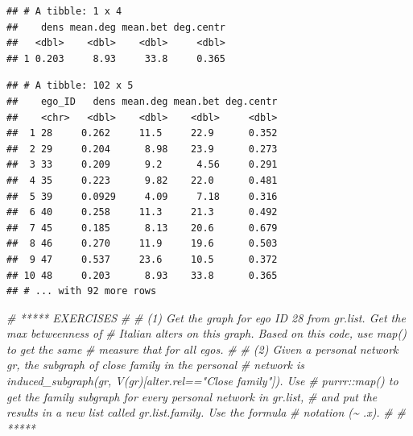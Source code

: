 \documentclass[
]{book}
\newenvironment{Shaded}{\begin{snugshade}}{\end{snugshade}}
\newcommand{\AttributeTok}[1]{\textcolor[rgb]{0.77,0.63,0.00}{#1}}
\newcommand{\CommentTok}[1]{\textcolor[rgb]{0.56,0.35,0.01}{\textit{#1}}}
\newcommand{\ConstantTok}[1]{\textcolor[rgb]{0.00,0.00,0.00}{#1}}
\newcommand{\FunctionTok}[1]{\textcolor[rgb]{0.00,0.00,0.00}{#1}}
\newcommand{\NormalTok}[1]{#1}
\newcommand{\SpecialCharTok}[1]{\textcolor[rgb]{0.00,0.00,0.00}{#1}}
\newcommand{\StringTok}[1]{\textcolor[rgb]{0.31,0.60,0.02}{#1}}
\begin{document}
\begin{verbatim}
## # A tibble: 1 x 4
##    dens mean.deg mean.bet deg.centr
##   <dbl>    <dbl>    <dbl>     <dbl>
## 1 0.203     8.93     33.8     0.365
\end{verbatim}

\begin{Shaded}
\end{Shaded}

\begin{verbatim}
## # A tibble: 102 x 5
##    ego_ID   dens mean.deg mean.bet deg.centr
##    <chr>   <dbl>    <dbl>    <dbl>     <dbl>
##  1 28     0.262     11.5     22.9      0.352
##  2 29     0.204      8.98    23.9      0.273
##  3 33     0.209      9.2      4.56     0.291
##  4 35     0.223      9.82    22.0      0.481
##  5 39     0.0929     4.09     7.18     0.316
##  6 40     0.258     11.3     21.3      0.492
##  7 45     0.185      8.13    20.6      0.679
##  8 46     0.270     11.9     19.6      0.503
##  9 47     0.537     23.6     10.5      0.372
## 10 48     0.203      8.93    33.8      0.365
## # ... with 92 more rows
\end{verbatim}

\begin{Shaded}
\begin{Highlighting}[]
\CommentTok{\# ***** EXERCISES}
\CommentTok{\#}
\CommentTok{\# (1) Get the graph for ego ID 28 from gr.list. Get the max betweenness of}
\CommentTok{\# Italian alters on this graph. Based on this code, use map() to get the same}
\CommentTok{\# measure that for all egos.}
\CommentTok{\#}
\CommentTok{\# (2) Given a personal network gr, the subgraph of close family in the personal}
\CommentTok{\# network is induced\_subgraph(gr, V(gr)[alter.rel=="Close family"]). Use}
\CommentTok{\# purrr::map() to get the family subgraph for every personal network in gr.list,}
\CommentTok{\# and put the results in a new list called gr.list.family. Use the formula}
\CommentTok{\# notation (\textasciitilde{} .x).}
\CommentTok{\#}
\CommentTok{\# *****}
\end{Highlighting}
\end{Shaded}
\end{document}
